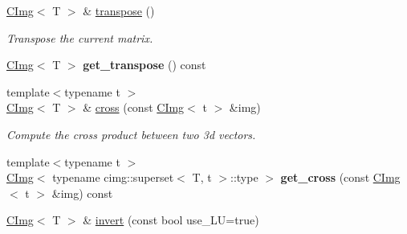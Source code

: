 \begin{DoxyCompactItemize}
\item 
\hypertarget{structcimg__library_1_1CImg_a49f00018eac2d649fa10c8a25c31c0df}{
\hyperlink{structcimg__library_1_1CImg}{CImg}$<$ T $>$ \& \hyperlink{structcimg__library_1_1CImg_a49f00018eac2d649fa10c8a25c31c0df}{transpose} ()}
\label{structcimg__library_1_1CImg_a49f00018eac2d649fa10c8a25c31c0df}

\begin{DoxyCompactList}\small\item\em Transpose the current matrix. \item\end{DoxyCompactList}\item 
\hypertarget{structcimg__library_1_1CImg_aed804862b61096d9aa58ebb809deeb26}{
\hyperlink{structcimg__library_1_1CImg}{CImg}$<$ T $>$ {\bfseries get\_\-transpose} () const }
\label{structcimg__library_1_1CImg_aed804862b61096d9aa58ebb809deeb26}

\item 
\hypertarget{structcimg__library_1_1CImg_a49ccd3590b6edcf060b2c8def95d96a7}{
{\footnotesize template$<$typename t $>$ }\\\hyperlink{structcimg__library_1_1CImg}{CImg}$<$ T $>$ \& \hyperlink{structcimg__library_1_1CImg_a49ccd3590b6edcf060b2c8def95d96a7}{cross} (const \hyperlink{structcimg__library_1_1CImg}{CImg}$<$ t $>$ \&img)}
\label{structcimg__library_1_1CImg_a49ccd3590b6edcf060b2c8def95d96a7}

\begin{DoxyCompactList}\small\item\em Compute the cross product between two 3d vectors. \item\end{DoxyCompactList}\item 
\hypertarget{structcimg__library_1_1CImg_aa2ea08b9937f3e508bb2d5c1dfcd6d8b}{
{\footnotesize template$<$typename t $>$ }\\\hyperlink{structcimg__library_1_1CImg}{CImg}$<$ typename cimg::superset$<$ T, t $>$::type $>$ {\bfseries get\_\-cross} (const \hyperlink{structcimg__library_1_1CImg}{CImg}$<$ t $>$ \&img) const }
\label{structcimg__library_1_1CImg_aa2ea08b9937f3e508bb2d5c1dfcd6d8b}

\item 
\hypertarget{structcimg__library_1_1CImg_a930302996a00b75e7e4ea7b4d6dea821}{
\hyperlink{structcimg__library_1_1CImg}{CImg}$<$ T $>$ \& \hyperlink{structcimg__library_1_1CImg_a930302996a00b75e7e4ea7b4d6dea821}{invert} (const bool use\_\-LU=true)}
\label{structcimg__library_1_1CImg_a930302996a00b75e7e4ea7b4d6dea821}


\end{DoxyCompactItemize}

